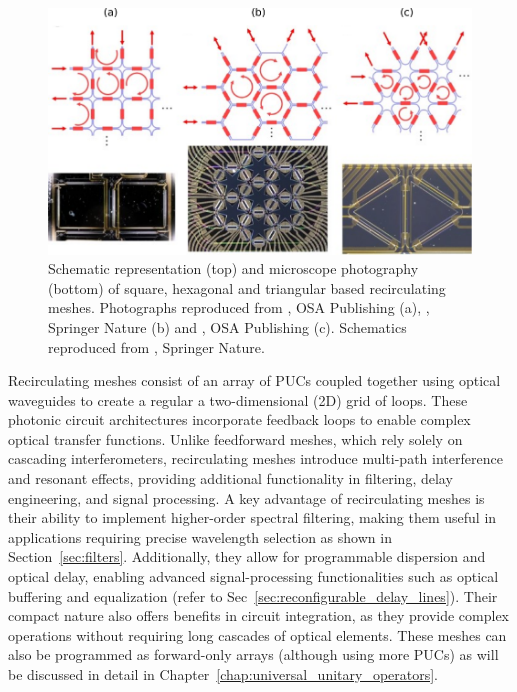 \begin{figure}[h]
	\begin{center}
		\includegraphics{figures/ch2-recirculating.pdf}
	\end{center}
	\caption{Schematic representation (top) and microscope photography (bottom) of square, hexagonal and triangular based recirculating meshes.
		Photographs reproduced from \cite{zhuang_programmable_2015}, OSA Publishing (a), \cite{perez_multipurpose_2017}, Springer Nature (b) and \cite{perez-lopez_integrated_2019}, OSA Publishing (c).
		Schematics reproduced from \cite{bogaerts_programmable_2020}, Springer Nature.
	}\label{fig:ch2-recirculating}
\end{figure}

Recirculating meshes consist of an array of PUCs coupled together using optical waveguides to create a regular a two-dimensional (2D) grid of loops.
These photonic circuit architectures incorporate feedback loops to enable complex optical transfer functions.
Unlike feedforward meshes, which rely solely on cascading interferometers, recirculating meshes introduce multi-path interference and resonant effects, providing additional functionality in filtering, delay engineering, and signal processing.
A key advantage of recirculating meshes is their ability to implement higher-order spectral filtering, making them useful in applications requiring precise wavelength selection as shown in Section~\ref{sec:filters}.
Additionally, they allow for programmable dispersion and optical delay, enabling advanced signal-processing functionalities such as optical buffering and equalization (refer to Sec~\ref{sec:reconfigurable_delay_lines}).
Their compact nature also offers benefits in circuit integration, as they provide complex operations without requiring long cascades of optical elements.
These meshes can also be programmed as forward-only arrays (although using more PUCs) as will be discussed in detail in Chapter~\ref{chap:universal_unitary_operators}.


